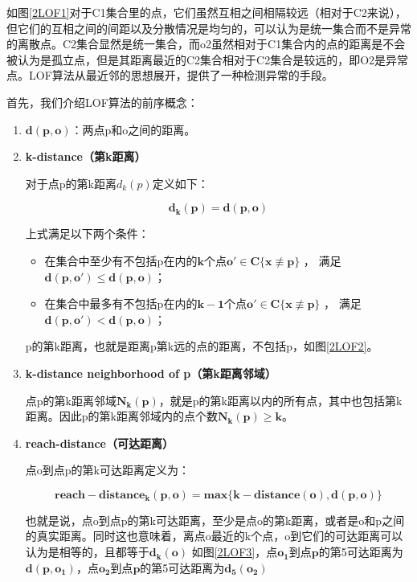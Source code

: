 \documentclass[a4paper,AutoFakeBold,oneside,12pt]{book}
\begin{document}
	如图\ref{2LOF1}对于C1集合里的点，它们虽然互相之间相隔较远（相对于C2来说），但它们的互相之间的间距以及分散情况是均匀的，可以认为是统一集合而不是异常的离散点。C2集合显然是统一集合，而o2虽然相对于C1集合内的点的距离是不会被认为是孤立点，但是其距离最近的C2集合相对于C2集合是较远的，即O2是异常点。LOF算法从最近邻的思想展开，提供了一种检测异常的手段。


	首先，我们介绍LOF算法的前序概念：
	\begin{enumerate}
	\item \textbf{$\bm{d(p,o)}$}：两点p和o之间的距离。
	\item \textbf{k-distance（第k距离）}
	
	对于点p的第k距离$d_k(p)$定义如下：
	
	\begin{equation}
	\bm{d_k(p)}=\bm{d(p,o)}
	\end{equation}
	
	上式满足以下两个条件：
	\begin{itemize}
	\item 在集合中至少有不包括p在内的$\bm{k}$个点$\bm{o'}\in\bm{C\{x\not\equiv p\}}$ ， 满足$\bm{d(p,o')}\leq\bm{d(p,o)}$； 
	\item 在集合中最多有不包括p在内的$\bm{k-1}$个点$\bm{o'}\in\bm{C\{x\not\equiv p\}}$ ， 满足$\bm{d(p,o')}<\bm{d(p,o)}$； 
	\end{itemize}
	
	p的第k距离，也就是距离p第k远的点的距离，不包括p，如图\ref{2LOF2}。 


	\item \textbf{k-distance neighborhood of p（第k距离邻域）}

	点p的第k距离邻域$\bm{N_k(p)}$，就是p的第k距离以内的所有点，其中也包括第k距离。因此p的第k距离邻域内的点个数$\bm{N_k(p)}\ge\bm{k}$。

	\item \textbf{reach-distance（可达距离）}
	
	点o到点p的第k可达距离定义为：

	\begin{equation}
	\bm{reach}-\bm{distance_k(p,o)}=\bm{max\{k-distance(o),d(p,o)\}}
	\end{equation}

	 也就是说，点o到点p的第k可达距离，至少是点o的第k距离，或者是o和p之间的真实距离。同时这也意味着，离点o最近的k个点，o到它们的可达距离可以认为是相等的，且都等于$\bm{d_k(o)}$
	如图\ref{2LOF3}，点$\bm{o_1}$到点$\bm{p}$的第5可达距离为$\bm{d(p,o_1)}$，点$\bm{o_2}$到点$\bm{p}$的第5可达距离为$\bm{d_5(o_2)}$


\end{enumerate}
\end{document}
